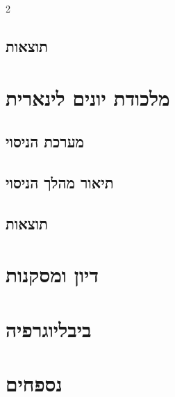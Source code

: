 \documentclass{article}
\begin{document}
\begin{multicols}{2}
\subsection{תוצאות}

\section{מלכודת יונים לינארית}
\subsection{מערכת הניסוי}
\subsection{תיאור מהלך הניסוי}
\subsection{תוצאות}


\section{דיון ומסקנות}


\newpage
\section*{ביבליוגרפיה}

\begin{LTR}
\printbibliography[heading=none]
\end{LTR}

\appendix
\renewcommand{\thesection}{\alph{section}}
\section{נספחים}
\setcounter{figure}{0}
\renewcommand{\thefigure}{\thesection.\arabic{figure}}
\renewcommand{\figurename}{נספח}

\end{multicols}
\end{document}
